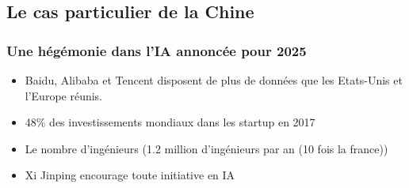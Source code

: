 \subsection{Le cas particulier de la Chine}

\begin{frame}
\end{frame}

\begin{frame}
  \frametitle{Une hégémonie dans l'IA annoncée pour 2025}
  \begin{itemize}
  \item Baidu, Alibaba et Tencent disposent de plus de données que les Etats-Unis et l’Europe réunis.
  \item 48\% des investissements mondiaux dans les startup en 2017
  \item Le nombre d'ingénieurs (1.2 million d'ingénieurs par an (10 fois la france))
  \item Xi Jinping encourage toute initiative en IA
  \end{itemize}
\end{frame}

